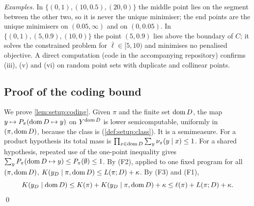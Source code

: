 \emph{Examples.} In $\{(0,1),(10,0.5),(20,0)\}$ the middle point lies on the segment between the other two, so it is never the unique minimiser; the end points are the unique minimisers on $(0.05,\infty)$ and on $(0,0.05)$. In $\{(0,1),(5,0.9),(10,0)\}$ the point $(5,0.9)$ lies above the boundary of $C$; it solves the constrained problem for $\bar\ell\in[5,10)$ and minimises no penalised objective. A direct computation (code in the accompanying repository) confirms (iii), (v) and (vi) on random point sets with duplicate and collinear points.

\subsection{Proof of the coding bound}\label{app:setup:coding}

We prove \cref{lem:setup:coding}. Given $\pi$ and the finite set $\operatorname{dom} D$, the map $y\mapsto P_\pi(\operatorname{dom} D\mapsto y)$ on $Y^{\operatorname{dom} D}$ is lower semicomputable, uniformly in $(\pi,\operatorname{dom} D)$, because the class is (\cref{def:setup:class}). It is a semimeasure. For a product hypothesis its total mass is $\prod_{x\in\operatorname{dom} D}\sum_y\nu_\pi(y\mid x)\le1$. For a shared hypothesis, repeated use of the one-point inequality gives $\sum_{y}P_\pi(\operatorname{dom} D\mapsto y)\le P_\pi(\emptyset)\le1$. By (F2), applied to one fixed program for all $(\pi,\operatorname{dom} D)$, $K(y_D\mid\pi,\operatorname{dom} D)\le L(\pi;D)+\kappa$. By (F3) and (F1),
\[
K(y_D\mid\operatorname{dom} D)\le K(\pi)+K(y_D\mid\pi,\operatorname{dom} D)+\kappa\le\ell(\pi)+L(\pi;D)+\kappa.
\]
\qed

